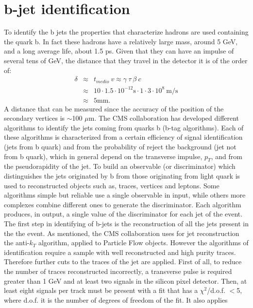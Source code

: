 \section{b-jet identification}
To identify the b jets  the properties that characterize hadrons are used
containing the quark b.
In fact these hadrons have a relatively large mass, around 5 GeV, and a long average life, about 1.5 ps. Given that they can
have an impulse of several tens of GeV, the distance that they travel in the detector
it is of the order of:
\begin{eqnarray}
\delta &\approx& t_{medio} \: v \approx \gamma \: \tau \: \beta  \: c  \nonumber \\
 &\approx& 10 \cdot 1.5 \cdot 10^{-12} \mbox{s} \cdot 1 \cdot 3 \cdot 10^8 \: \mbox{m/s}   \nonumber \\
 &\approx& 5  \mbox{mm.} \end{eqnarray}
A distance that can be measured since the accuracy of the position of the
secondary vertices is $\sim$100 $\mu$m.
The CMS collaboration has developed different algorithms to identify the jets coming from
  quarks b (b-tag algorithms). Each of these algorithms is characterized
from a certain efficiency of signal identification (jets from b quark) and from the probability of
reject the background (jet not from b quark), which in general depend on the transverse impulse,
$p_T$, and from the pseudorapidity  of the jet. To build an observable (or discriminator) which distinguishes 
the jets originated by b from those originating from light quark 
is used to reconstructed objects such as, traces, vertices and leptons. 
Some algorithms simple but reliable use a single observable in input, while others
more complexes combine different ones to generate the discriminator. Each algorithm
produces, in output, a single value of the discriminator for each jet of the event.
The first step in identifying of b-jets is the reconstruction of all the jets present in the
the event. As mentioned, the CMS collaboration uses for jet reconstruction
the anti-$k_T$ algorithm, applied to Particle Flow objects. However the algorithms of
identification require a sample with well reconstructed and high purity traces.
Therefore further cuts to the traces of the jet are applied. First of all, to reduce
the number of traces reconstructed incorrectly, a transverse pulse is required
greater than 1 GeV and at least two signals in the silicon pixel detector. Then, at 
least eight signals per track must be present with a fit that has a
 $\chi^2$/d.o.f. $<$5, where d.o.f. it is the number of degrees of freedom of the fit. It also applies
